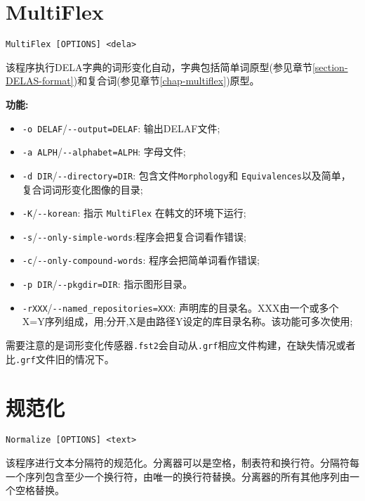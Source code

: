 \section{MultiFlex}
\verb+MultiFlex [OPTIONS] <dela>+

\bigskip
\noindent {}
该程序执行DELA字典的词形变化自动，字典包括简单词原型(参见章节\ref{section-DELAS-format})和复合词(参见章节\ref{chap-multiflex})原型。

\bigskip
\noindent \textbf{功能:}
\begin{itemize}
\item \verb+-o DELAF+/\verb+--output=DELAF+: 输出DELAF文件;
  \item \verb+-a ALPH+/\verb+--alphabet=ALPH+: 字母文件;
  \item \verb+-d DIR+/\verb+--directory=DIR+: 包含文件\verb+Morphology+和 \verb+Equivalences+以及简单，复合词词形变化图像的目录;
  \item \verb+-K+/\verb+--korean+: 指示 \verb+MultiFlex+ 在韩文的环境下运行;
  \item \verb+-s+/\verb+--only-simple-words+:程序会把复合词看作错误;
  \item \verb+-c+/\verb+--only-compound-words+: 程序会把简单词看作错误;
  \item \verb+-p DIR+/\verb+--pkgdir=DIR+: 指示图形目录。
  \item \verb+-rXXX+/\verb+--named_repositories=XXX+: 声明库的目录名。XXX由一个或多个X=Y序列组成，用;分开,X是由路径Y设定的库目录名称。该功能可多次使用;
  
\end{itemize}

\bigskip
\noindent 需要注意的是词形变化传感器\verb+.fst2+会自动从\verb+.grf+相应文件构建，在缺失情况或者比\verb+.grf+文件旧的情况下。







\section{规范化}
\label{section-Normalize}
\verb+Normalize [OPTIONS] <text>+

\bigskip
\noindent {} 
该程序进行文本分隔符的规范化。分离器可以是空格，制表符和换行符。分隔符每一个序列包含至少一个换行符，由唯一的换行符替换。分离器的所有其他序列由一个空格替换。

